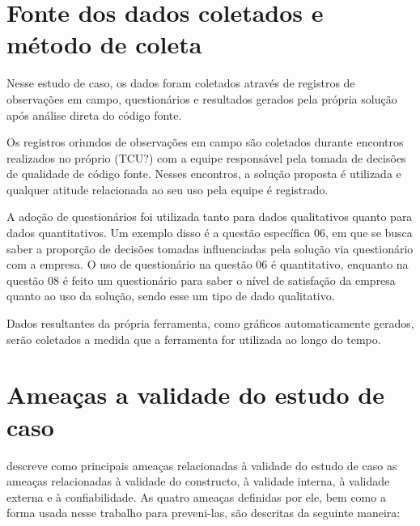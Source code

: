 \section{Fonte dos dados coletados e método de coleta}

Nesse estudo de caso, os dados foram coletados através de registros de observações em campo, questionários e resultados gerados pela própria solução após análise direta do código fonte.

Os registros oriundos de observações em campo são coletados durante encontros realizados no próprio (TCU?) com a equipe responsável pela tomada de decisões de qualidade de código fonte. Nesses encontros, a solução proposta é utilizada e qualquer atitude relacionada ao seu uso pela equipe é registrado.

A adoção de questionários foi utilizada tanto para dados qualitativos quanto para dados quantitativos. Um exemplo disso é a questão específica 06, em que se busca saber a proporção de decisões tomadas influenciadas pela solução via questionário com a empresa. O uso de questionário na questão 06 é quantitativo, enquanto na questão 08 é feito um questionário para saber o nível de satisfação da empresa quanto ao uso da solução, sendo esse um tipo de dado qualitativo.

Dados resultantes da própria ferramenta, como gráficos automaticamente gerados, serão coletados a medida que a ferramenta for utilizada ao longo do tempo.

\section{Ameaças a validade do estudo de caso}

 descreve como principais ameaças relacionadas à validade do estudo de caso as ameaças relacionadas à validade do constructo, à validade interna, à validade externa e à confiabilidade. As quatro ameaças definidas por ele, bem como a forma usada nesse trabalho para preveni-las, são descritas da seguinte maneira: 

